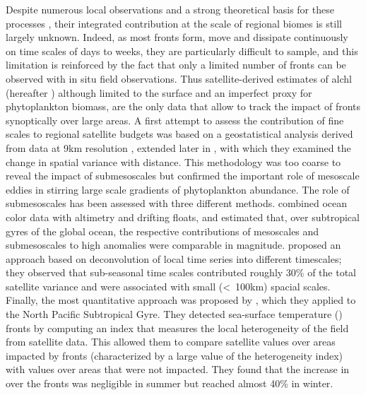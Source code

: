 Despite numerous local observations and a strong theoretical basis for these processes \parencite[e.g. recent studies by][]{marrec_2018, little_2018, verneil_2019, ruiz_2019, uchida_2020, kessouri_2020, tzortzis_2021}, their integrated contribution at the scale of regional biomes is still largely unknown.
Indeed, as most fronts form, move and dissipate continuously on time scales of days to weeks, they are particularly difficult to sample, and this limitation is reinforced by the fact that only a limited number of fronts can be observed with in situ field observations.
Thus satellite-derived estimates of al{chl} (hereafter ) although limited to the surface and an imperfect proxy for phytoplankton biomass, are the only data that allow to track the impact of fronts synoptically over large areas.
A first attempt to assess the contribution of fine scales to regional satellite  budgets was based on a geostatistical analysis derived from data at 9km resolution \parencite{doney_2003}, extended later in \textcite{glover_2018}, with which they examined the change in spatial variance with distance.
This methodology was too coarse to reveal the impact of submesoscales but confirmed the important role of mesoscale eddies in stirring large scale gradients of phytoplankton abundance.
The role of submesoscales has been assessed with three different methods.
\textcite{guo_2019} combined ocean color data with altimetry and drifting floats, and estimated that, over subtropical gyres of the global ocean, the respective contributions of mesoscales and submesoscales to high  anomalies were comparable in magnitude.
\textcite{keerthi_2022} proposed an approach based on deconvolution of local  time series into different timescales; they observed that sub-seasonal time scales contributed roughly 30\% of the total satellite  variance and were associated with small (\textless\ 100km) spacial scales.
Finally, the most quantitative approach was proposed by \textcite{liu_2016}, which they applied to the North Pacific Subtropical Gyre.
They detected sea-surface temperature () fronts by computing an index that measures the local heterogeneity of the  field from satellite  data.
This allowed them to compare satellite  values over areas impacted by fronts (characterized by a large value of the heterogeneity index) with values over areas that were not impacted.
They found that the increase in  over the fronts was negligible in summer but reached almost 40\% in winter.


